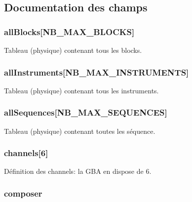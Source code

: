 \subsection{Documentation des champs}
\hypertarget{struct_f_a_t_ac7fd37a6fdc98d68f68a4ca0082a31a0}{
\subsubsection[{allBlocks}]{ {\bf allBlocks}\mbox{[}NB\_\-MAX\_\-BLOCKS\mbox{]}}}
\label{struct_f_a_t_ac7fd37a6fdc98d68f68a4ca0082a31a0}
Tableau (physique) contenant tous les blocks. \hypertarget{struct_f_a_t_af95be502ce562f33d068959c2d3a6c14}{
\subsubsection[{allInstruments}]{ {\bf allInstruments}\mbox{[}NB\_\-MAX\_\-INSTRUMENTS\mbox{]}}}
\label{struct_f_a_t_af95be502ce562f33d068959c2d3a6c14}
Tableau (physique) contenant tous les instruments. \hypertarget{struct_f_a_t_aedb7f8fa6f53bd2273c70a9febd76aaa}{
\subsubsection[{allSequences}]{ {\bf allSequences}\mbox{[}NB\_\-MAX\_\-SEQUENCES\mbox{]}}}
\label{struct_f_a_t_aedb7f8fa6f53bd2273c70a9febd76aaa}
Tableau (physique) contenant toutes les séquence. \hypertarget{struct_f_a_t_a87102826e08bc9bdb2ca1bf0b53f8ac9}{
\subsubsection[{channels}]{ {\bf channels}\mbox{[}6\mbox{]}}}
\label{struct_f_a_t_a87102826e08bc9bdb2ca1bf0b53f8ac9}
Définition des channels: la GBA en dispose de 6. \hypertarget{struct_f_a_t_a5295928ddfd03f71d0fe60e2877b253a}{
\subsubsection[{composer}]{ {\bf composer}}}
